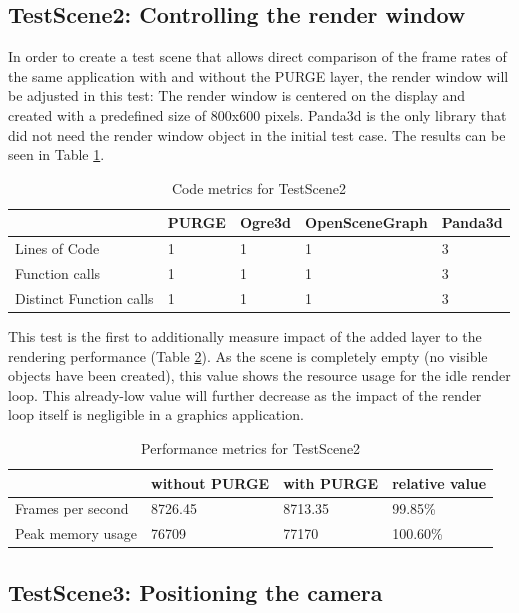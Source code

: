 \subsection{TestScene2: Controlling the render window}

	In order to create a test scene that allows direct comparison of the frame rates of the same application with and without the PURGE layer, the render window will be adjusted in this test: The render window is centered on the display and created with a predefined size of 800x600 pixels. Panda3d is the only library that did not need the render window object in the initial test case. The results can be seen in Table \ref{tbl:Code2}.

	\begin{table}[htpb]
		\center
		\caption{Code metrics for TestScene2}
		\begin{tabular}{l | l | l | l | l}
			& PURGE & Ogre3d & OpenSceneGraph & Panda3d\\ \hline
			Lines of Code & 1 & 1 & 1 & 3\\
			Function calls & 1 & 1 & 1 & 3\\
			Distinct Function calls & 1 & 1 & 1 & 3\\
		\end{tabular}
		\label{tbl:Code2}
	\end{table}

	This test is the first to additionally measure impact of the added layer to the rendering performance (Table \ref{tbl:Performance2}). As the scene is completely empty (no visible objects have been created), this value shows the resource usage for the idle render loop. This already-low value will further decrease as the impact of the render loop itself is negligible in a graphics application.
	
	\begin{table}[htpb]
		\center
		\caption{Performance metrics for TestScene2}
		\begin{tabular}{l | l | l | l}
			& without PURGE & with PURGE & relative value\\ \hline
			Frames per second & 8726.45 & 8713.35 & 99.85\%\\
			Peak memory usage & 76709 & 77170 & 100.60\%\\
		\end{tabular}
		\label{tbl:Performance2}
	\end{table}

\subsection{TestScene3: Positioning the camera}

